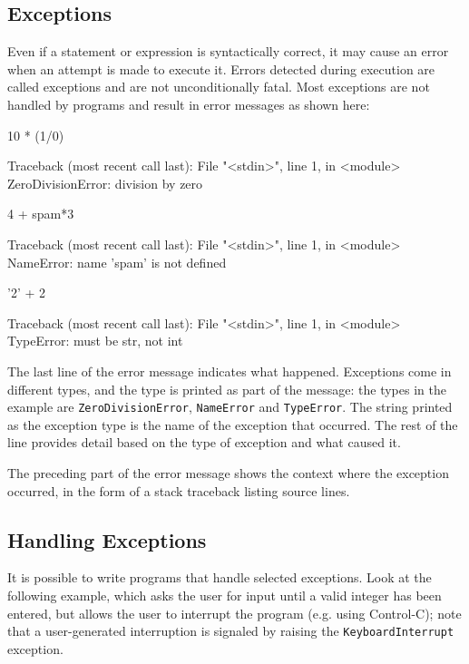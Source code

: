 \subsection{Exceptions}
Even if a statement or expression is syntactically correct, it may cause an error when an attempt is made to execute it. Errors detected during execution are called exceptions and are not unconditionally fatal. Most exceptions are not handled by programs and result in error messages as shown here:

\begin{ipython}
10 * (1/0)
\end{ipython}
\begin{ioutput}
Traceback (most recent call last):
  File "<stdin>", line 1, in <module>
ZeroDivisionError: division by zero
\end{ioutput}

\begin{ipython}
4 + spam*3
\end{ipython}
\begin{ioutput}
Traceback (most recent call last):
  File "<stdin>", line 1, in <module>
NameError: name 'spam' is not defined
\end{ioutput}

\begin{ipython}
'2' + 2
\end{ipython}
\begin{ioutput}
Traceback (most recent call last):
  File "<stdin>", line 1, in <module>
TypeError: must be str, not int
\end{ioutput}

The last line of the error message indicates what happened. Exceptions come in different types, and the type is printed as part of the message: the types in the example are \texttt{ZeroDivisionError}, \texttt{NameError} and \texttt{TypeError}. The string printed as the exception type is the name of the exception that occurred. The rest of the line provides detail based on the type of exception and what caused it.

The preceding part of the error message shows the context where the exception occurred, in the form of a stack traceback listing source lines.

\subsection{Handling Exceptions}
It is possible to write programs that handle selected exceptions. Look at the following example, which asks the user for input until a valid integer has been entered, but allows the user to interrupt the program (e.g. using Control-C); note that a user-generated interruption is signaled by raising the \texttt{KeyboardInterrupt} exception.


